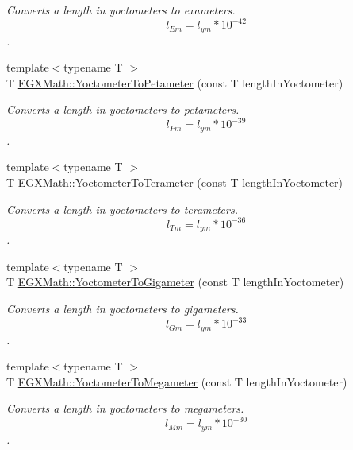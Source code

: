 \begin{DoxyCompactItemize}
\begin{DoxyCompactList}\small\item\em Converts a length in yoctometers to exameters. \[ l_{Em}=l_{ym} * 10^{-42} \]. \end{DoxyCompactList}\item 
{\footnotesize template$<$typename T $>$ }\\T \mbox{\hyperlink{group___e_g_x_math-_conversions-_length_conversions-_yoctometer-_s_i_ga8336f2eef297fcf72ddb1fc0f79dfa5e}{E\+G\+X\+Math\+::\+Yoctometer\+To\+Petameter}} (const T length\+In\+Yoctometer)
\begin{DoxyCompactList}\small\item\em Converts a length in yoctometers to petameters. \[ l_{Pm}=l_{ym} * 10^{-39} \]. \end{DoxyCompactList}\item 
{\footnotesize template$<$typename T $>$ }\\T \mbox{\hyperlink{group___e_g_x_math-_conversions-_length_conversions-_yoctometer-_s_i_gae5313d3fbe14e0cbb4b58d4d432857e1}{E\+G\+X\+Math\+::\+Yoctometer\+To\+Terameter}} (const T length\+In\+Yoctometer)
\begin{DoxyCompactList}\small\item\em Converts a length in yoctometers to terameters. \[ l_{Tm}=l_{ym} * 10^{-36} \]. \end{DoxyCompactList}\item 
{\footnotesize template$<$typename T $>$ }\\T \mbox{\hyperlink{group___e_g_x_math-_conversions-_length_conversions-_yoctometer-_s_i_ga48f8e5df818edfde1006bf08ebdeee33}{E\+G\+X\+Math\+::\+Yoctometer\+To\+Gigameter}} (const T length\+In\+Yoctometer)
\begin{DoxyCompactList}\small\item\em Converts a length in yoctometers to gigameters. \[ l_{Gm}=l_{ym} * 10^{-33} \]. \end{DoxyCompactList}\item 
{\footnotesize template$<$typename T $>$ }\\T \mbox{\hyperlink{group___e_g_x_math-_conversions-_length_conversions-_yoctometer-_s_i_ga638081d766f4299ceede9574c1c3242b}{E\+G\+X\+Math\+::\+Yoctometer\+To\+Megameter}} (const T length\+In\+Yoctometer)
\begin{DoxyCompactList}\small\item\em Converts a length in yoctometers to megameters. \[ l_{Mm}=l_{ym} * 10^{-30} \]. \end{DoxyCompactList}\item 

\end{DoxyCompactItemize}

